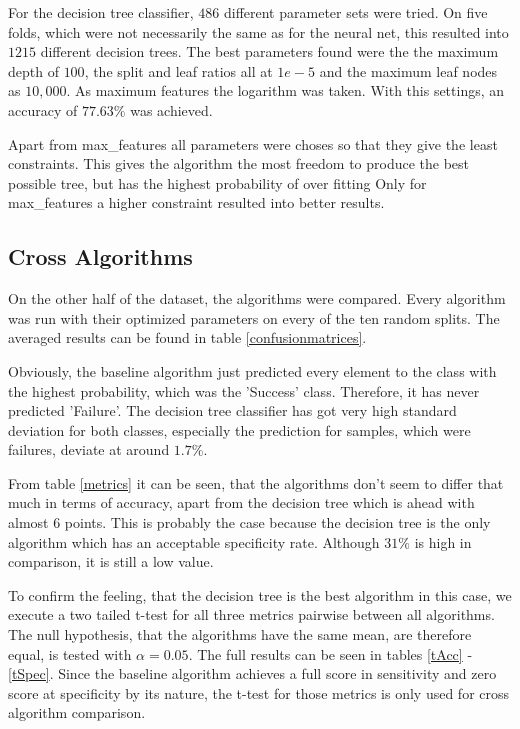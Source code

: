 \documentclass[a4paper,11pt]{article}
\begin{document}
For the decision tree classifier, $486$ different parameter sets were tried. On five folds, which were not necessarily the same as for the neural net, this resulted into $1215$ different decision trees.
The best parameters found were the the maximum depth of $100$, the split and leaf ratios all at $1e-5$ and the maximum leaf nodes as $10,000$. As maximum features the logarithm was taken. With this settings, an accuracy of $77.63\%$ was achieved. 

Apart from max\_features all parameters were choses so that they give the least constraints. This gives the algorithm the most freedom to produce the best possible tree, but has the highest probability of over fitting Only for max\_features a higher constraint resulted into better results.

\subsection{Cross Algorithms}





On the other half of the dataset, the algorithms were compared. Every algorithm was run with their optimized parameters on every of the ten random splits. The averaged results can be found in table \ref{confusionmatrices}.

Obviously, the baseline algorithm just predicted every element to the class with the highest probability, which was the 'Success' class. Therefore, it has never predicted 'Failure'. The decision tree classifier has got very high standard deviation for both classes, especially the prediction for samples, which were failures, deviate at around $1.7\%$. 

From table \ref{metrics} it can be seen, that the algorithms don't seem to differ that much in terms of accuracy, apart from the decision tree which is ahead with almost $6$ points. This is probably the case because the decision tree is the only algorithm which has an acceptable specificity rate. Although $31\%$ is high in comparison, it is still a low value. 

To confirm the feeling, that the decision tree is the best algorithm in this case, we execute a two tailed t-test for all three metrics pairwise between all algorithms. The null hypothesis, that the algorithms have the same mean, are therefore equal, is tested with $\alpha = 0.05$. The full results can be seen in tables \ref{tAcc} - \ref{tSpec}.
Since the baseline algorithm achieves a full score in sensitivity and zero score at specificity by its nature, the t-test for those metrics is only used for cross algorithm comparison. 
\end{document}
